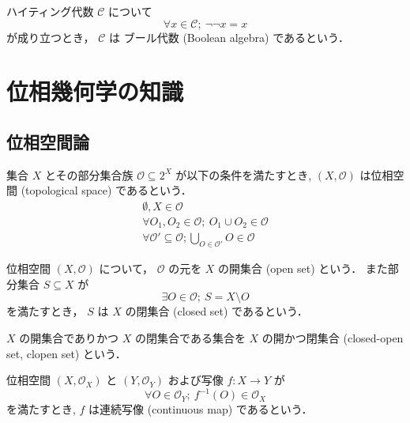 \documentclass[titlepage]{ltjsreport}
\newcommand{\cat}[1]{\mathscr{#1}}
\newcommand{\objs}[1]{#1}
\begin{document}
\begin{definition}[ブール代数]\label{def:boolean-algebra}
  ハイティング代数 $\cat{C}$ について
  \begin{equation}
    \forall x\in\objs{\cat{C}};\ \neg\neg x=x
  \end{equation}
  が成り立つとき，
  $\cat{C}$ は ブール代数 (Boolean algebra) であるという．
\end{definition}

\chapter{位相幾何学の知識}

\section{位相空間論}

\begin{definition}[位相空間]\label{def:topological-space}
  集合 $X$ とその部分集合族 $\mathcal{O}\subseteq2^X$ が以下の条件を満たすとき,
  $(X,\mathcal{O})$ は位相空間 (topological space) であるという．
  \begin{align}
    \emptyset,X\in\mathcal{O}                                 \\
    \forall O_1,O_2\in\mathcal{O};\ O_1\cup O_2\in\mathcal{O} \\
    \forall \mathcal{O}'\subseteq\mathcal{O};
    \bigcup_{O\in\mathcal{O}'}O\in\mathcal{O}
  \end{align}
\end{definition}

\begin{definition}
  位相空間 $(X,\mathcal{O})$ について，
  $\mathcal{O}$ の元を $X$ の開集合 (open set) という．
  また部分集合 $S\subseteq X$ が
  \begin{equation}
    \exists O\in\mathcal{O};\ S=X\setminus O
  \end{equation}
  を満たすとき，
  $S$ は $X$ の閉集合 (closed set) であるという．

  $X$ の開集合でありかつ $X$ の閉集合である集合を
  $X$ の開かつ閉集合 (closed-open set, clopen set) という．
\end{definition}

\begin{definition}[連続写像]\label{def:continuous-map}
  位相空間 $(X,\mathcal{O}_X)$ と $(Y,\mathcal{O}_Y)$ および写像 $f:X\to Y$ が
  \begin{equation}
    \forall O\in\mathcal{O}_Y;\ f^{-1}(O)\in\mathcal{O}_X
  \end{equation}
  を満たすとき,
  $f$ は連続写像 (continuous map) であるという．
\end{definition}
\end{document}
